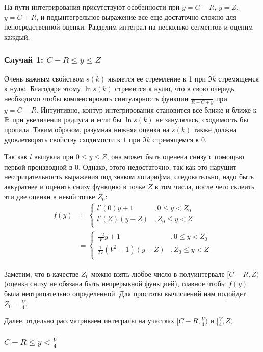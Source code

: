 На пути интегрирования присутствуют особенности при $y = C - R$, $y = Z$, $y = C + R$, и подынтегрельное выражение все еще достаточно сложно для непосредственной оценки. Разделим интеграл на несколько сегментов и оценим каждый.

\subsubsection{Случай 1: $C - R \le y \le Z$}
Очень важным свойством $s(k)$ является ее стремление к 1 при $\Im k$ стремящемся к нулю. Благодаря этому $\ln s(k)$ стремится к нулю, что в свою очередь необходимо чтобы компенсировать сингулярность функции $\frac{1}{R - C + y}$ при $y = C - R$. Интуитивно, контур интегрирования становится все ближе и ближе к $\mathbb{R}$ при увеличении радиуса и если бы $\ln s(k)$ не занулялась, сходимость бы пропала. Таким образом, разумная нижняя оценка на $s(k)$ также должна удовлетворять свойству сходимости к $1$ при $\Im k$ стремящемся к $0$.

Так как $l$ выпукла при $0 \le y \le Z$, она может быть оценена снизу с помощью первой производной в $0$. Однако, этого недостаточно, так как это нарушит неотрицательность выражения под знаком логарифма, следовательно, надо быть аккуратнее и оценить снизу функцию в точке $Z$ в том числа, после чего склеить эти две оценки в некой точке $Z_0$:
\begin{align*}
f(y)
& = 
\begin{cases}
l'(0) y + 1   &, 0 \le y < Z_0  \\
l'(Z) (y - Z) &, Z_0 \le y < Z \\
\end{cases}
\\
& =
\begin{cases}
\frac{-2}{V} y + 1   &, 0 \le y < Z_0  \\
\frac{1}{2 V}(V^2 - 1) (y - Z) &, Z_0 \le y < Z \\
\end{cases}
\end{align*}

Заметим, что в качестве $Z_0$ можно взять любое число в полуинтервале $[C-R, Z)$ (оценка снизу не обязана быть непрерывной функцией), главное чтобы $f(y)$ была неотрицательно определенной. Для простоты вычислений нам подойдет $Z_0 = \frac{V}{4}$. 

Далее, отдельно рассматриваем интегралы на участках $[C - R, \frac{V}{4})$ и $[\frac{V}{4}, Z)$.

\subsubsection{$C - R \le y < \frac{V}{4}$}

